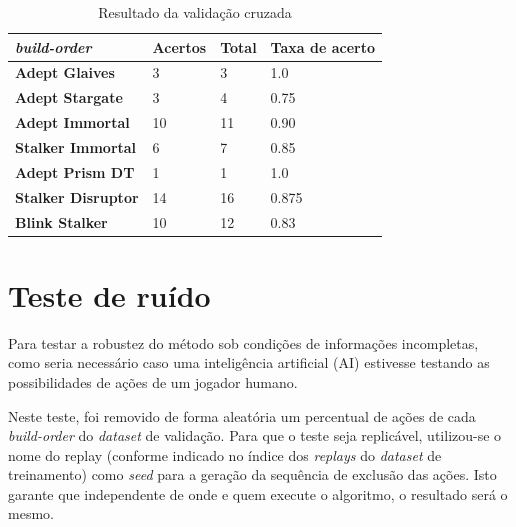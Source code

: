 \begin{table}[H]
\centering
\caption{Resultado da validação cruzada}
\label{tab:resultados-cruzada}
\begin{tabular}{l|l|l|l}
	\textit{\Gls{build-order}} 		& Acertos 	& Total & Taxa de acerto 	\\ \hline
	\textbf{Adept Glaives} 		& 3  		& 3  	& 1.0				\\
	\textbf{Adept Stargate} 		& 3  		& 4 		& 0.75				\\
	\textbf{Adept Immortal} 		& 10 		& 11 	& 0.90				\\
	\textbf{Stalker Immortal} 	& 6  		& 7  	& 0.85				\\
	\textbf{Adept Prism DT} 		& 1  		& 1  	& 1.0				\\
	\textbf{Stalker Disruptor} 	& 14  		& 16  	& 0.875				\\
	\textbf{Blink Stalker}	 	& 10  		& 12  	& 0.83	
\end{tabular}
\end{table}

		\section{Teste de ruído}
Para testar a robustez do método sob condições de informações incompletas, como seria necessário caso uma inteligência artificial (AI) estivesse testando as possibilidades de ações de um jogador humano.

Neste teste, foi removido de forma aleatória um percentual de ações de cada \textit{\gls{build-order}} do \textit{dataset} de validação. Para que o teste seja replicável, utilizou-se o nome do \gls{replay} (conforme indicado no índice dos \textit{\glspl{replay}} do \textit{dataset} de treinamento) como \textit{seed} para a geração da sequência de exclusão das ações. Isto garante que independente de onde e quem execute o algoritmo, o resultado será o mesmo.

